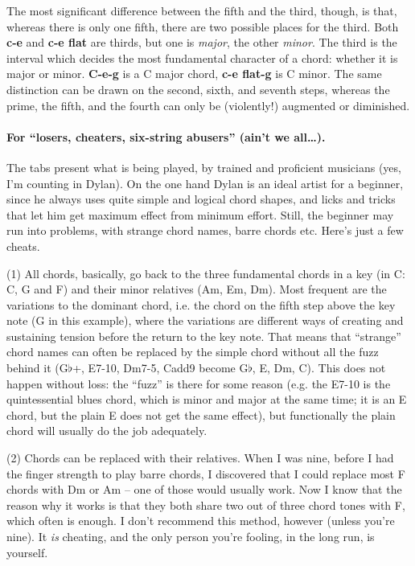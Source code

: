 The most significant difference between the fifth and the third,
though, is that, whereas there is only one fifth, there are two
possible places for the third. Both \textbf{c-e} and \textbf{c-e flat}
are thirds, but one is \emph{major}, the other \emph{minor}. The third
is the interval which decides the most fundamental character of a
chord: whether it is major or minor. \textbf{C-e-g} is a C major
chord, \textbf{c-e flat-g}  is C minor. The same distinction can be
drawn on the second, sixth, and seventh steps, whereas the prime, the
fifth, and the fourth can only be (violently!) augmented or
diminished.

\paragraph{For ``losers, cheaters, six-string abusers'' (ain't we
all\ldots).}  The tabs present what is being played, by trained and
proficient musicians (yes, I'm counting in Dylan). On the one hand
Dylan is an ideal artist for a beginner, since he always uses quite
simple and logical chord shapes, and licks and tricks that let him get
maximum effect from minimum effort. Still, the beginner may run into
problems, with strange chord names, barre chords etc. Here's just a
few cheats.

(1) All chords, basically, go back to the three fundamental chords in
a key (in C: C, G and F) and their minor relatives (Am, Em, Dm). Most
frequent are the variations to the dominant chord, i.e. the chord on
the fifth step above the key note (G in this example), where the
variations are different ways of creating and sustaining tension
before the return to the key note. That means that ``{}strange''{}
chord names can often be replaced by the simple chord without all the
fuzz behind it (G$\flat$+, E7-10, Dm7-5, Cadd9 become G$\flat$, E, Dm,
C). This does not happen without loss: the ``{}fuzz''{} is there for
some reason (e.g. the E7-10 is the quintessential blues chord, which
is minor and major at the same time; it is an E chord, but the plain E
does not get the same effect), but functionally the plain chord will
usually do the job adequately.

(2) Chords can be replaced with their relatives. When I was nine,
before I had the finger strength to play barre chords, I discovered
that I could replace most F chords with Dm or Am -- one of those would
usually work. Now I know that the reason why it works is that they
both share two out of three chord tones with F, which often is
enough. I don't recommend this method, however (unless you're
nine). It \emph{is} cheating, and the only person you're fooling, in
the long run, is yourself.

